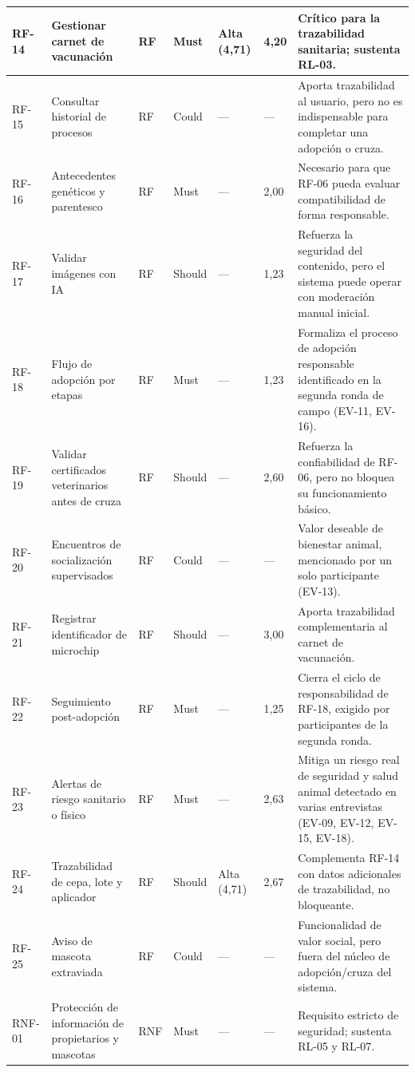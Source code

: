 \documentclass[journal,onecolumn]{IEEEtran}
\begin{document}
\begin{landscape}
\begin{longtable}{@{}p{1.2cm} p{5.2cm} p{1.0cm} p{1.3cm} p{1.3cm} p{1.1cm} p{6.5cm}@{}}
			RF-14 & Gestionar carnet de vacunación & RF & Must & Alta (4,71) & 4,20 & Crítico para la trazabilidad sanitaria; sustenta RL-03. \\ \midrule
			RF-15 & Consultar historial de procesos & RF & Could & --- & --- & Aporta trazabilidad al usuario, pero no es indispensable para completar una adopción o cruza. \\ \midrule
			RF-16 & Antecedentes genéticos y parentesco & RF & Must & --- & 2,00 & Necesario para que RF-06 pueda evaluar compatibilidad de forma responsable. \\ \midrule
			RF-17 & Validar imágenes con IA & RF & Should & --- & 1,23 & Refuerza la seguridad del contenido, pero el sistema puede operar con moderación manual inicial. \\ \midrule
			RF-18 & Flujo de adopción por etapas & RF & Must & --- & 1,23 & Formaliza el proceso de adopción responsable identificado en la segunda ronda de campo (EV-11, EV-16). \\ \midrule
			RF-19 & Validar certificados veterinarios antes de cruza & RF & Should & --- & 2,60 & Refuerza la confiabilidad de RF-06, pero no bloquea su funcionamiento básico. \\ \midrule
			RF-20 & Encuentros de socialización supervisados & RF & Could & --- & --- & Valor deseable de bienestar animal, mencionado por un solo participante (EV-13). \\ \midrule
			RF-21 & Registrar identificador de microchip & RF & Should & --- & 3,00 & Aporta trazabilidad complementaria al carnet de vacunación. \\ \midrule
			RF-22 & Seguimiento post-adopción & RF & Must & --- & 1,25 & Cierra el ciclo de responsabilidad de RF-18, exigido por participantes de la segunda ronda. \\ \midrule
			RF-23 & Alertas de riesgo sanitario o físico & RF & Must & --- & 2,63 & Mitiga un riesgo real de seguridad y salud animal detectado en varias entrevistas (EV-09, EV-12, EV-15, EV-18). \\ \midrule
			RF-24 & Trazabilidad de cepa, lote y aplicador & RF & Should & Alta (4,71) & 2,67 & Complementa RF-14 con datos adicionales de trazabilidad, no bloqueante. \\ \midrule
			RF-25 & Aviso de mascota extraviada & RF & Could & --- & --- & Funcionalidad de valor social, pero fuera del núcleo de adopción/cruza del sistema. \\ \midrule
			RNF-01 & Protección de información de propietarios y mascotas & RNF & Must & --- & --- & Requisito estricto de seguridad; sustenta RL-05 y RL-07. \\ \midrule

\end{longtable}
\end{landscape}
\end{document}
